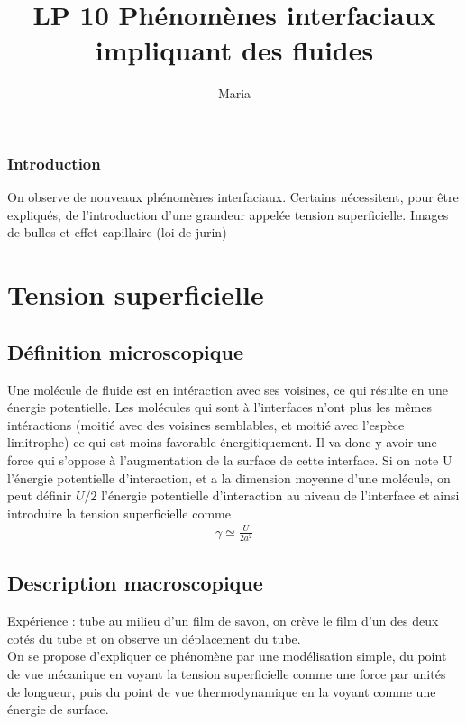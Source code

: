 \documentclass[12pt,prb,aps,epsf]{report}
\begin{document}
	
	\title{LP 10 Phénomènes interfaciaux impliquant des fluides}
	\author{Maria}
	
	\maketitle
	
	\tableofcontents
	
	\pagebreak
	
	
\subsubsection{Introduction}
On observe de nouveaux phénomènes interfaciaux. Certains nécessitent, pour être expliqués, de l'introduction d'une grandeur appelée tension superficielle. Images de bulles et effet capillaire (loi de jurin)
\section{Tension superficielle}
\subsection{Définition microscopique}
Une molécule de fluide est en intéraction avec ses voisines, ce qui résulte en une énergie potentielle. Les molécules qui sont à l'interfaces n'ont plus les mêmes intéractions (moitié avec des voisines semblables, et moitié avec l'espèce limitrophe) ce qui est moins favorable énergitiquement. Il va donc y avoir une force qui s'oppose à l'augmentation de la surface de cette interface. Si on note U l'énergie potentielle d'interaction, et a la dimension moyenne d'une molécule, on peut définir $U/2$ l'énergie potentielle d'interaction au niveau de l'interface et ainsi introduire la tension superficielle comme 
\begin{eqnarray}
\gamma \simeq \frac{U}{2a^2}
\end{eqnarray}
\subsection{Description macroscopique}
Expérience : tube au milieu d'un film de savon, on crève le film d'un des deux cotés du tube et on observe un déplacement du tube.\\
On se propose d'expliquer ce phénomène par une modélisation simple, du point de vue mécanique en voyant la tension superficielle comme une force par unités de longueur, puis du point de vue thermodynamique en la voyant comme une énergie de surface.
\end{document}
